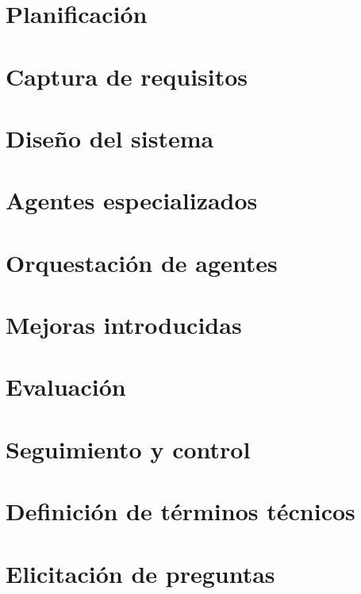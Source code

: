 \documentclass[a4page, 11pt, showtrims]{memoir}
\begin{document}
\chapter{Planificación} \label{ch:chap3}

\clearpage
\chapter{Captura de requisitos} \label{ch:chap4}

\clearpage
\chapter{Diseño del sistema} \label{ch:chap5}

\clearpage
\chapter{Agentes especializados} \label{ch:chap6}

\clearpage
\chapter{Orquestación de agentes} \label{ch:chap7}

\clearpage
\chapter{Mejoras introducidas} \label{ch:chap8}

\clearpage
\chapter{Evaluación} \label{ch:chap9}

\clearpage
\chapter{Seguimiento y control} \label{ch:chap10}

\clearpage




\appendix
\renewcommand{\thesection}{A.\arabic{section}}
\renewcommand{\thesubsection}{A.\arabic{section}.\arabic{subsection}}
\setcounter{section}{0}
\setcounter{subsection}{0}
\chapter{Definición de términos técnicos}

\chapter{Elicitación de preguntas}

\end{document}
